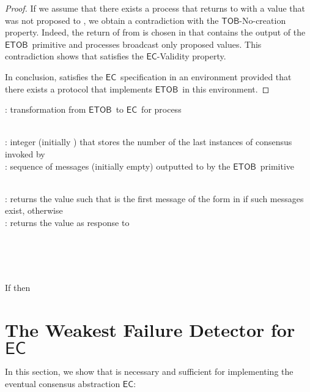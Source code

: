 \documentclass[11pt]{article}
\newcommand{\EC}{\ensuremath{\mathsf{EC}}}
\newcommand{\ETOB}{\ensuremath{\mathsf{ETOB}}}
\newcommand{\TOB}{\ensuremath{\mathsf{TOB}}}
\begin{document}
\begin{proof}
If we assume that there exists a process  that returns to  with  a value that was not proposed to , we obtain a contradiction with the \TOB-No-creation property. Indeed, the return of  from  is chosen in  that contains the output of the \ETOB~primitive and processes broadcast only proposed values. This contradiction shows that  satisfies the \EC-Validity property.

In conclusion,  satisfies the \EC~specification in an environment  provided that there exists a protocol that implements \ETOB~in this environment.
\end{proof}

\begin{algorithm}
\caption{: transformation from \ETOB~to \EC~for process }\label{algo:ETOBtoEC}
\small
\begin{description}\itemsep0pt
\item[Internal variables:]~\\
: integer (initially ) that stores the number of the last instances of consensus invoked by \\
: sequence of messages (initially empty) outputted to  by the \ETOB~primitive

\item[Functions:]~\\
: returns the value  such that  is the first message of the form  in  if such messages exist,  otherwise\\
: returns the value  as response to 

\item[On invocation of ]~\\
\\


\item[On local time out]~\\
If  then\\

\end{description}
\normalsize
\end{algorithm}
 








\section{The Weakest Failure Detector for \EC}
\label{sec:WFD}

In this section, we show that  is necessary and sufficient for
implementing the eventual consensus abstraction \EC:
\end{document}
